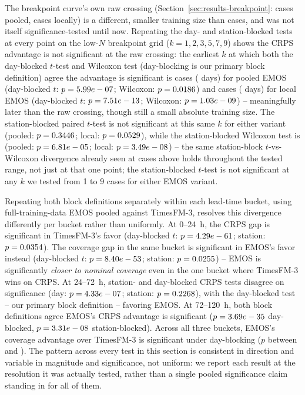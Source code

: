 The breakpoint curve's own raw crossing (Section~\ref{sec:results-breakpoint}:
\BpCrpsPooledCases{} cases pooled, \BpCrpsLocalCases{} cases locally) is a
different, smaller training size than \SigTestNCases{} cases, and was not
itself significance-tested until now. Repeating the day- and
station-blocked tests at every point on the low-\(N\) breakpoint grid
(\(k=1,2,3,5,7,9\)) shows the CRPS advantage is not significant at the
raw crossing: the earliest \(k\) at which both the day-blocked \(t\)-test
and Wilcoxon test (day-blocking is our primary block definition) agree
the advantage is significant is
\BpCrpsPooledSigK{} cases (\BpCrpsPooledSigDays{} days) for pooled EMOS
(day-blocked \(t\): \(p=5.99e-07\); Wilcoxon:
\(p=0.0186\)) and \BpCrpsLocalSigK{} cases
(\BpCrpsLocalSigDays{} days) for local EMOS (day-blocked \(t\):
\(p=7.51e-13\); Wilcoxon: \(p=1.03e-09\)) --
meaningfully later than the raw crossing, though still a small absolute
training size. The station-blocked paired \(t\)-test is not significant
at this same \(k\) for either variant (pooled: \(p=0.3446\);
local: \(p=0.0529\)), while the station-blocked Wilcoxon
test is (pooled: \(p=6.81e-05\); local:
\(p=3.49e-08\)) -- the same station-block
\(t\)-vs-Wilcoxon divergence already seen at \SigTestNCases{} cases above
holds throughout the tested range, not just at that one point; the
station-blocked \(t\)-test is not significant at any \(k\) we tested from
1 to 9 cases for either EMOS variant.

Repeating both block definitions separately within each lead-time bucket,
using full-training-data EMOS pooled against TimesFM-3, resolves this
divergence differently per bucket rather than uniformly. At 0--24~h, the
CRPS gap is significant in TimesFM-3's favor (day-blocked \(t\):
\(p=4.29e-61\); station:
\(p=0.0354\)). The coverage gap in the same
bucket is significant in EMOS's favor instead (day-blocked \(t\):
\(p=8.40e-53\); station:
\(p=0.0255\)) -- EMOS is significantly
\emph{closer to nominal coverage} even in the one bucket where TimesFM-3
wins on CRPS. At 24--72~h, station- and day-blocked
CRPS tests disagree on significance (day: \(p=4.33e-07\);
station: \(p=0.2268\)), with the day-blocked test --
our primary block definition -- favoring EMOS. At 72--120~h, both block
definitions agree EMOS's CRPS advantage is significant
(\(p=3.69e-35\) day-blocked,
\(p=3.31e-08\) station-blocked). Across all three
buckets, EMOS's coverage advantage over TimesFM-3 is significant under
day-blocking (\(p\) between \LeadSigCoverageBucketShortDayT{} and
\LeadSigCoverageBucketLongDayT{}). The pattern across every test in this
section is consistent in direction and variable in magnitude and
significance, not uniform: we report each result at the resolution it was
actually tested, rather than a single pooled significance claim standing
in for all of them.
